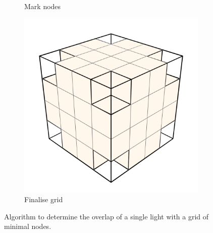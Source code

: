 \begin{figure}[t]
\begin{subfigure}[b]{.3\linewidth}
    \caption{\footnotesize Mark nodes}%
    \label{fig:hs-p1h}%
  \end{subfigure}
  \begin{subfigure}[b]{.3\linewidth}
    \includegraphics[width=\textwidth]{./img/raw/hs-slt-algorithm/hs-slt-algorithm-9.png}%
    \caption{\footnotesize Finalise grid}%
    \label{fig:hs-p1i}%
  \end{subfigure}

  \caption{Algorithm to determine the overlap of a single light with a grid of minimal nodes.}
  \label{fig:hs-mark}
\end{figure}

